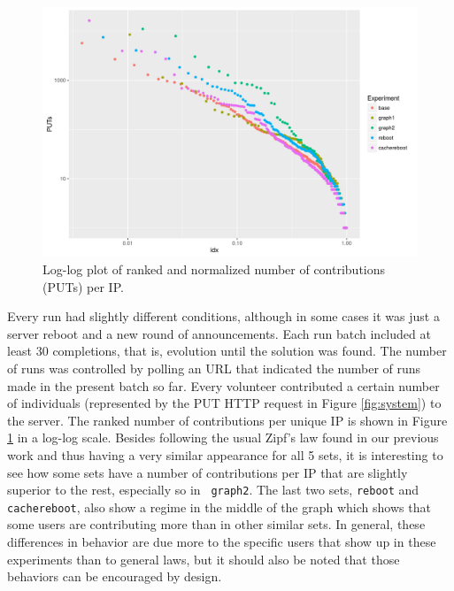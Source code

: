 \documentclass[runningheads,a4paper]{llncs}\usepackage[]{graphicx}\usepackage[]{color}
\makeatletter
\def\maxwidth{ %
  \ifdim\Gin@nat@width>\linewidth
    \linewidth
  \else
    \Gin@nat@width
  \fi
}
\newenvironment{knitrout}{}{} %
\makeatother
\begin{document}
%
%
\begin{figure}[htbp]
\centering
\begin{knitrout}
\color{fgcolor}
\includegraphics[width=\maxwidth]{figure/zipf-1} 

\end{knitrout}
%
\caption{Log-log plot of ranked and normalized number of contributions (PUTs) per IP.\label{fig:zipf}}
\end{figure}
%
Every run had slightly different conditions, although in some cases it
was just a server reboot and a new round of announcements. Each run
batch included at least 30 completions, that is, evolution until the
solution was found. The number of runs was controlled by polling an
URL that indicated the number of runs made in the present batch so
far. Every volunteer contributed a certain number of individuals
(represented by the PUT HTTP request in Figure \ref{fig:system}) to the server. The ranked number
of contributions per unique IP is shown in Figure \ref{fig:zipf} in a
log-log scale. Besides following the usual Zipf's law found in our
previous work and thus having a very similar appearance for all 5 sets, it
is interesting to see how some sets have a number of contributions per
IP that are slightly superior to the rest, especially so in {\tt
  graph2}. The last two sets, {\tt reboot} and {\tt cachereboot}, also
show a regime in the middle of the graph which shows that some users
are contributing more than in other similar sets. In general, these
differences in behavior are due more to the specific users that show
up in these experiments than to general laws, but it should also be
noted that those behaviors can be encouraged by design.
\end{document}
